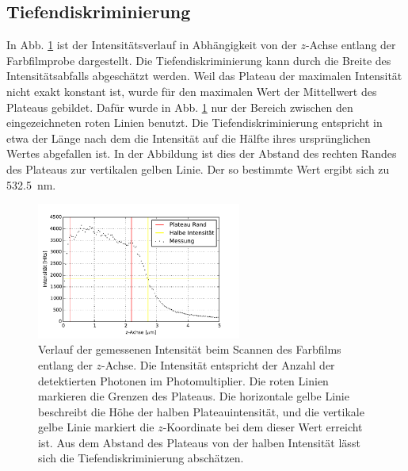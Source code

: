 \subsection{Tiefendiskriminierung}
In Abb. \ref{fig:tiefe} ist der Intensitätsverlauf in Abhängigkeit von der $z$-Achse entlang der Farbfilmprobe dargestellt.
Die Tiefendiskriminierung kann durch die Breite des Intensitätsabfalls abgeschätzt werden.
Weil das Plateau der maximalen Intensität nicht exakt konstant ist, wurde für den maximalen Wert der Mittellwert des Plateaus gebildet.
Dafür wurde in Abb. \ref{fig:tiefe} nur der Bereich zwischen den eingezeichneten roten Linien benutzt.
Die Tiefendiskriminierung entspricht in etwa der Länge nach dem die Intensität auf die Hälfte ihres ursprünglichen Wertes abgefallen ist.
In der Abbildung ist dies der Abstand des rechten Randes des Plateaus zur vertikalen gelben Linie.
Der so bestimmte Wert ergibt sich zu 532.5~nm.

\begin{figure}
	\centering
	\includegraphics[width=0.6\textwidth]{plots/tiefe.pdf}
	\caption{Verlauf der gemessenen Intensität beim Scannen des Farbfilms entlang der $z$-Achse. Die Intensität entspricht der Anzahl der detektierten Photonen im Photomultiplier.
		Die roten Linien markieren die Grenzen des Plateaus. 
		Die horizontale gelbe Linie beschreibt die Höhe der halben Plateauintensität, und die vertikale gelbe Linie markiert die $z$-Koordinate bei dem dieser Wert erreicht ist.
		Aus dem Abstand des Plateaus von der halben Intensität lässt sich die Tiefendiskriminierung abschätzen.
	}\label{fig:tiefe}
\end{figure}
\newpage
